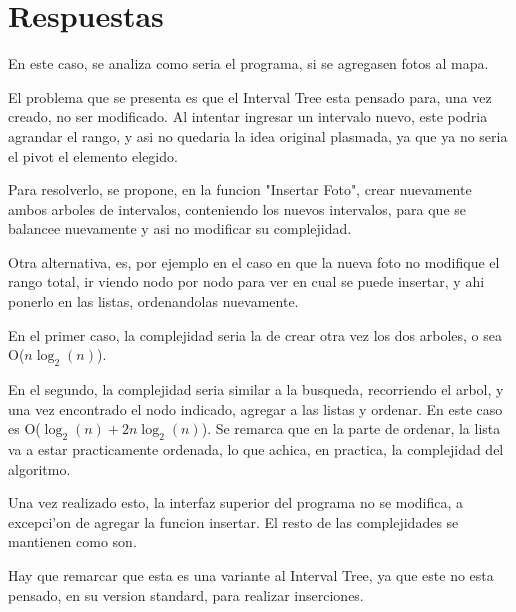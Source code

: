 
\section{Respuestas}
En este caso, se analiza como seria el programa, si se agregasen fotos al mapa.


El problema que se presenta es que el Interval Tree esta pensado para, una vez creado, no ser modificado. Al intentar ingresar un intervalo nuevo, este podria agrandar el rango, y asi no quedaria la idea original plasmada, ya que ya no seria el pivot el elemento elegido.


Para resolverlo, se propone, en la funcion "Insertar Foto", crear nuevamente ambos arboles de intervalos, conteniendo los nuevos intervalos, para que se balancee nuevamente y asi no modificar su complejidad.


Otra alternativa, es, por ejemplo en el caso en que la nueva foto no modifique el rango total, ir viendo nodo por nodo para ver en cual se puede insertar, y ahi ponerlo en las listas, ordenandolas nuevamente.


En el primer caso, la complejidad seria la de crear otra vez los dos arboles, o sea O($n\log_2(n)$).


En el segundo, la complejidad seria similar a la busqueda, recorriendo el arbol, y una vez encontrado el nodo indicado, agregar a las listas y ordenar. En este caso es O($\log_2(n) + 2n\log_2(n)$). Se remarca que en la parte de ordenar, la lista va a estar practicamente ordenada, lo que achica, en practica, la complejidad del algoritmo.

Una vez realizado esto, la interfaz superior del programa no se modifica, a excepci'on de agregar la funcion insertar. El resto de las complejidades se mantienen como son.

Hay que remarcar que esta es una variante al Interval Tree, ya que este no esta pensado, en su version standard, para realizar inserciones.

